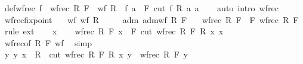 \begin{isabellebody}
\isamarkupfalse%
\ def{\isacharunderscore}{\kern0pt}wfrec{\isacharcolon}{\kern0pt}\ {\isachardoublequoteopen}f\ {\isasymequiv}\ wfrec\ R\ F\ {\isasymLongrightarrow}\ wf\ R\ {\isasymLongrightarrow}\ f\ a\ {\isacharequal}{\kern0pt}\ F\ {\isacharparenleft}{\kern0pt}cut\ f\ R\ a{\isacharparenright}{\kern0pt}\ a{\isachardoublequoteclose}\isanewline
%
\isadelimproof
\ \ %
\endisadelimproof
%
\isatagproof
{}\isamarkupfalse%
\ {\isacharparenleft}{\kern0pt}auto\ intro{\isacharcolon}{\kern0pt}\ wfrec{\isacharparenright}{\kern0pt}%
\endisatagproof
{\isafoldproof}%
%
\isadelimproof
%
\endisadelimproof
%
\isadelimdocument
%
\endisadelimdocument
%
\isatagdocument
%
\isamarkuptrue%
%
\endisatagdocument
{\isafolddocument}%
%
\isadelimdocument
%
\endisadelimdocument
{}\isamarkupfalse%
\ wfrec{\isacharunderscore}{\kern0pt}fixpoint{\isacharcolon}{\kern0pt}\isanewline
\ \ \ wf{\isacharcolon}{\kern0pt}\ {\isachardoublequoteopen}wf\ R{\isachardoublequoteclose}\isanewline
\ \ \ \ \ adm{\isacharcolon}{\kern0pt}\ {\isachardoublequoteopen}adm{\isacharunderscore}{\kern0pt}wf\ R\ F{\isachardoublequoteclose}\isanewline
\ \ \ {\isachardoublequoteopen}wfrec\ R\ F\ {\isacharequal}{\kern0pt}\ F\ {\isacharparenleft}{\kern0pt}wfrec\ R\ F{\isacharparenright}{\kern0pt}{\isachardoublequoteclose}\isanewline
%
\isadelimproof
%
\endisadelimproof
%
\isatagproof
{}\isamarkupfalse%
\ {\isacharparenleft}{\kern0pt}rule\ ext{\isacharparenright}{\kern0pt}\isanewline
\ \ \isamarkupfalse%
\ x\isanewline
\ \ \isamarkupfalse%
\ {\isachardoublequoteopen}wfrec\ R\ F\ x\ {\isacharequal}{\kern0pt}\ F\ {\isacharparenleft}{\kern0pt}cut\ {\isacharparenleft}{\kern0pt}wfrec\ R\ F{\isacharparenright}{\kern0pt}\ R\ x{\isacharparenright}{\kern0pt}\ x{\isachardoublequoteclose}\isanewline
\ \ \ \ \isamarkupfalse%
\ wfrec{\isacharbrackleft}{\kern0pt}of\ R\ F{\isacharbrackright}{\kern0pt}\ wf\ \isamarkupfalse%
\ simp\isanewline
\ \ \isamarkupfalse%
\isanewline
\ \ \isamarkupfalse%
\ {\isachardoublequoteopen}{\isasymAnd}y{\isachardot}{\kern0pt}\ {\isacharparenleft}{\kern0pt}y{\isacharcomma}{\kern0pt}\ x{\isacharparenright}{\kern0pt}\ {\isasymin}\ R\ {\isasymLongrightarrow}\ cut\ {\isacharparenleft}{\kern0pt}wfrec\ R\ F{\isacharparenright}{\kern0pt}\ R\ x\ y\ {\isacharequal}{\kern0pt}\ wfrec\ R\ F\ y{\isachardoublequoteclose}\isanewline
\ \ \ \ \isamarkupfalse%

\end{isabellebody}
